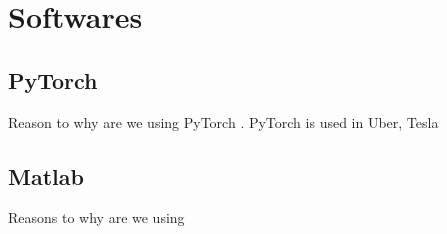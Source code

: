 \section{Softwares}

\subsection{PyTorch}
    Reason to why are we using PyTorch \citep{paszke2019}.
    PyTorch is used in Uber\citep{goodman2017}, Tesla\citep{pytorch2019} 
\subsection{Matlab}
    Reasons to why are we using \matlab